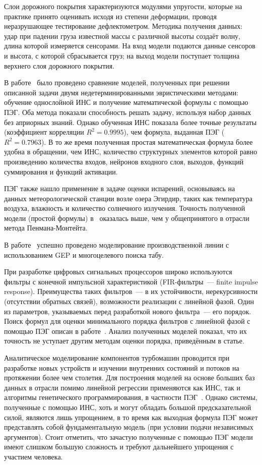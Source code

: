 Слои дорожного покрытия характеризуются модулями упругости, которые на практике принято оценивать исходя из степени деформации, проводя неразрушающее тестирование дефлектометром. Методика получения данных: удар при падении груза известной массы с различной высоты создаёт волну, длина которой измеряется сенсорами. На вход модели подаются данные сенсоров и высота, с которой сбрасывается груз; на выход модели поступает толщина верхнего слоя дорожного покрытия.

В работе~\cite{saltan:2005:IJEMS} было проведено сравнение моделей, полученных при решении описанной задачи двумя недетерминированными эвристическими методами: обучение однослойной ИНС и получение математической формулы с помощью ПЭГ. Оба метода показали способность решать задачу, используя набор данных без априорных знаний. Однако обученная ИНС показала более точные результаты (коэффициент корреляции $R^2=0.9995$), чем формула, выданная ПЭГ ($R^2=0.7963$). В то же время полученная простая математическая формула более удобна в обращении, чем ИНС, количество структурных элементов которой равно произведению количества входов, нейронов входного слоя, выходов, функций суммирования и функций активации.

ПЭГ также нашло применение в задаче оценки испарений, основываясь на данных метеорологической станции возле озера Эгирдир, таких как температура воздуха, влажность и количество солнечного излучения. Точность полученной модели (простой формулы) в~\cite{OzlemTerzi:2005:JAS} оказалась выше, чем у общепринятого в отрасли метода Пенмана-Монтейта.

В работе~\cite{Baykasoglu:2005:ICRM} успешно проведено моделирование производственной линии с использованием GEP и многоцелевого поиска табу.

При разработке цифровых сигнальных процессоров широко используются фильтры с конечной импульсной характеристикой (FIR-фильтры~--- finite impulse response). Преимущества таких фильтров~--- в их устойчивости, нерекурсивности (отсутствии обратных связей), возможности реализации с линейной фазой. Один из параметров, указываемых перед разработкой нового фильтра~--- его порядок. Поиск формул для оценки минимального порядка фильтров с линейной фазой с помощью ПЭГ описан в работе~\cite{GonzalezMunoz:2005:RVK}. Анализ полученных моделей показал, что их точность не уступает другим методам оценки порядка, приведённым в статье.

Аналитическое моделирование компонентов турбомашин проводится при разработке новых устройств и изучении внутренних состояний и потоков на протяжении более чем столетия. Для построения моделей на основе больших баз данных в отрасли помимо линейной регрессии применяются как ИНС, так и алгоритмы генетического программирования, в частности ПЭГ~\cite{MECE2005-79414R3, IMECE2005-79416-R3}. Однако системы, полученные с помощью ИНС, хоть и могут обладать большой предсказательной силой, являются лишь упрощением, в то время как выходная формула ПЭГ может представлять собой фундаментальную модель (при условии подачи независимых аргументов). Стоит отметить, что зачастую полученные с помощью ПЭГ модели имеют слишком большую сложность и требуют дальнейшего упрощения с участием человека.

